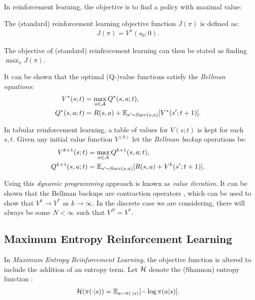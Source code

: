     In reinforcement learning, the objective is to find a policy with maximal value:
    \begin{defn}
        The \textnormal{(standard) reinforcement learning objective function} $J(\pi)$ is defined as:
        \begin{align}
            J(\pi) = V^{\pi}(s_0;0).
        \end{align}

        The objective of (standard) reinfrocement learning can then be stated as finding $\max_{\pi} J(\pi)$.
    \end{defn}

    It can be shown  that the optimal (Q-)value functions satisfy the \textit{Bellman equations}:
    \begin{align}
        V^*(s;t) &= \max_{a\in\mathcal{A}} Q^*(s,a;t), \\
        Q^*(s,a;t) &= R(s,a) + \mathbb{E}_{s'\sim \textnormal{Succ}(s,a)} [V^*(s';t+1)].
    \end{align} 

    In tabular reinforcement learning, a table of values for $V(s;t)$  is kept for each $s,t$. Given any initial value function $V^{(0)}$ let the \textit{Bellman backup} operations be:
    \begin{align}
        V^{k+1}(s;t) &= \max_{a\in\mathcal{A}} Q^{k+1}(s,a;t), \\
        Q^{k+1}(s,a;t) &= \mathbb{E}_{s'\sim \textnormal{Succ}(s,a)} [R(s,a) + V^k(s';t+1)].
    \end{align}

    Using this \textit{dynamic programming} approach is known as \textit{value iteration}. It can be shown that the Bellman backups are contraction operators , which can be used to show that $V^{k}\rightarrow V^*$ as $k\rightarrow \infty$. In the discrete  case we are considering, there will always be some $N<\infty$ such that $V^{N}=V^*$.


    \subsection{Maximum Entropy Reinforcement Learning}

        In \textit{Maximum Entropy Reinforcement Learning}, the objective function is altered to include the addition of an entropy term. Let $\mathcal{H}$ denote the (Shannon) entropy function :
        \begin{align}
            \mathcal{H}(\pi(\cdot|s)) = \mathbb{E}_{a\sim\pi(\cdot|s)}[-\log \pi(a|s)].
        \end{align}

